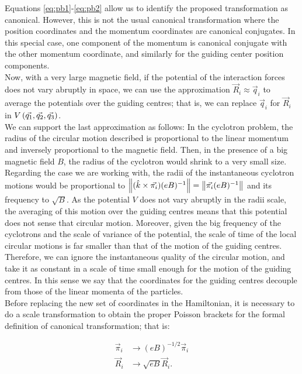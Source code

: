 Equations \eqref{eq:pb1}-\eqref{eq:pb2} allow us to identify the proposed transformation as canonical. However, this is not the usual canonical transformation where the position coordinates and the momentum coordinates are canonical conjugates. In this special case, one component of the momentum is canonical conjugate with the other momentum coordinate, and similarly for the guiding center position components.\\

Now, with a very large magnetic field, if the potential of the interaction forces does not vary abruptly in space, we can use the approximation $\vec{R}_i \approx \vec{q}_i$ to average the potentials over the guiding centres; that is, we can replace $\vec{q}_i$ for $\vec{R}_i$ in  $V \left(  \vec{q_1},\vec{q_2},\vec{q_3}  \right)$.\\

We can support the last approximation as follows: In the cyclotron problem, the radius of the circular motion described is proportional to the linear momentum and inversely proportional to the magnetic field. Then, in the presence of a big magnetic field $B$, the radius of the cyclotron would shrink to a very small size. Regarding the case we are working with, the radii of the instantaneous cyclotron motions would be proportional to $\left\lVert (\hat{k} \times \vec{\pi_i})(eB)^{-1} \right\rVert = \left\lVert \vec{\pi_i}(eB)^{-1} \right\rVert$ and its frequency to $\sqrt{B}$. As the potential $V$ does not vary abruptly in the radii scale, the averaging of this motion over the guiding centres means that this potential does not sense that circular motion. Moreover, given the big frequency of the cyclotrons and the scale of variance of the potential, the scale of time of the local circular motions is far smaller than that of the motion of the guiding centres. Therefore, we can ignore the instantaneous quality of the circular motion, and take it as constant in a scale of time small enough for the motion of the guiding centres. In this sense we say that the coordinates for the guiding centres decouple from those of the linear momenta of the particles.\\

Before replacing the new set of coordinates in the Hamiltonian, it is necessary to do a scale transformation to obtain the proper Poisson brackets for the formal definition of canonical transformation; that is:

\begin{align*}
\vec{\pi}_i & \rightarrow (eB)^{-1/2} \vec{ \pi}_i\\
\vec{R}_i & \rightarrow \sqrt{eB} \vec{R}_i.
\end{align*}

